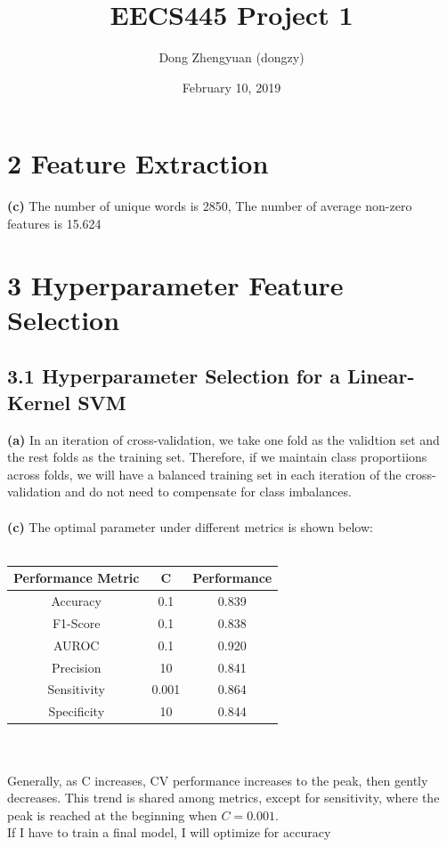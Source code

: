 \documentclass{article}
\title{EECS445 Project 1}
\author{Dong Zhengyuan (dongzy)}
\date{February 10, 2019}
\begin{document}
\maketitle

\section*{2 Feature Extraction}
\textbf{(c)}
The number of unique words is 2850,
The number of average non-zero features is 15.624

\section*{3 Hyperparameter Feature Selection}
\subsection*{3.1 Hyperparameter Selection for a Linear-Kernel SVM}
\textbf{(a)} In an iteration of cross-validation, we take one fold as the validtion set and
the rest folds as the training set. Therefore, if we maintain class proportiions across folds,
we will have a balanced training set in each iteration of the cross-validation
and do not need to compensate for class imbalances.\\ \\
\textbf{(c)} The optimal parameter under different metrics is shown below: \\ \\
\begin{tabular}{|c|c|c|}
\hline
\bf Performance Metric & \bf C & \bf Performance \\ \hline
Accuracy & 0.1 & 0.839 \\ \hline
F1-Score & 0.1 & 0.838 \\ \hline
AUROC & 0.1 & 0.920 \\ \hline
Precision & 10 & 0.841 \\ \hline
Sensitivity & 0.001 & 0.864 \\ \hline
Specificity & 10 & 0.844 \\ \hline
\end{tabular}\\ \\
\indent Generally, as C increases, CV performance increases to the peak,
then gently decreases. This trend is shared among metrics,
except for sensitivity, where the peak is reached at the beginning when $C=0.001$. \\
\indent If I have to train a final model, I will optimize for accuracy
\end{document}

